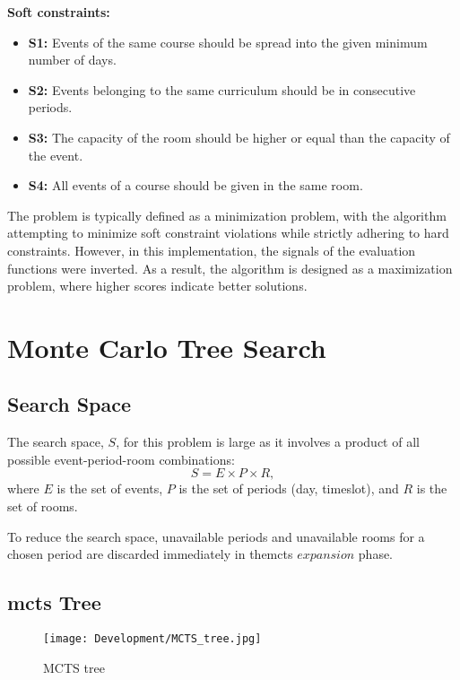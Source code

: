 \textbf{Soft constraints:}

\begin{itemize}
	\item \textbf{S1:} Events of the same course should be spread into the given minimum number of days.
	\item \textbf{S2:} Events belonging to the same curriculum should be in consecutive periods.
	\item \textbf{S3:} The capacity of the room should be higher or equal than the capacity of the event.
	\item \textbf{S4:} All events of a course should be given in the same room.
\end{itemize}

The problem is typically defined as a minimization problem, with the algorithm attempting to minimize soft constraint violations while strictly adhering to hard constraints. However, in this implementation, the signals of the evaluation functions were inverted. As a result, the algorithm is designed as a maximization problem, where higher scores indicate better solutions.

\section{Monte Carlo Tree Search}



\subsection{Search Space}

The search space, \(S\),  for this problem is large as it involves a product of all possible event-period-room combinations: \[S = E \times P  \times R,\] where \(E\) is the set of events, \(P\) is the set of periods (day, timeslot), and \(R\) is the set of rooms.

To reduce the search space, unavailable periods and unavailable rooms for a chosen period are discarded immediately in the\ac{mcts} \(expansion\) phase.

\subsection{\ac{mcts} Tree}

\begin{figure}
      \centering
      \texttt{[image: Development/MCTS\_tree.jpg]}
      \caption[MCTS tree]
      {MCTS tree}
      \label{fig:mcts_tree}
\end{figure}

